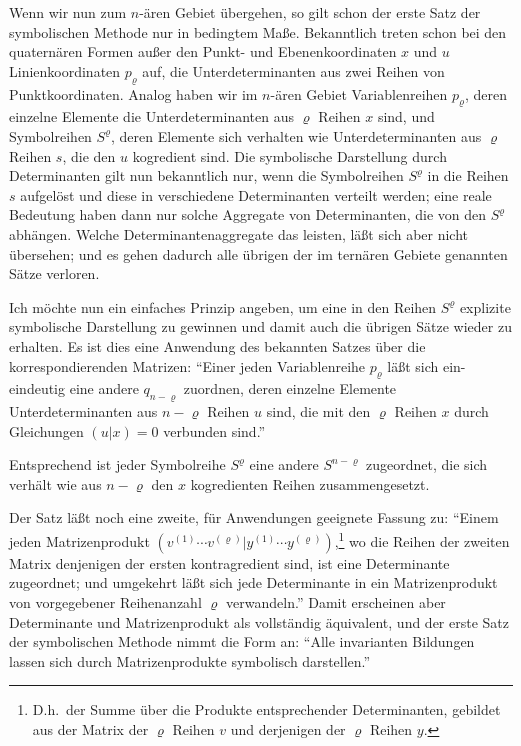 \documentclass[12pt,a4paper]{article}
\begin{document}
Wenn wir nun zum $n$-ären Gebiet übergehen, so gilt schon der erste Satz der symbolischen Methode nur in bedingtem Maße. Bekanntlich treten schon bei den quaternären Formen außer den Punkt- und Ebenenkoordinaten $x$ und $u$ Linienkoordinaten $p_{\varrho}$ auf, die Unterdeterminanten aus zwei Reihen von Punktkoordinaten. Analog haben wir im $n$-ären Gebiet Variablenreihen $p_{\varrho}$, deren einzelne Elemente die Unterdeterminanten aus $\varrho$ Reihen $x$ sind, und Symbolreihen $S^{\varrho}$, deren Elemente sich verhalten wie Unterdeterminanten aus $\varrho$ Reihen $s$, die den $u$ kogredient sind. Die symbolische Darstellung durch Determinanten gilt nun bekanntlich nur, wenn die Symbolreihen $S^{\varrho}$ in die Reihen $s$ aufgelöst und diese in verschiedene Determinanten verteilt werden; eine reale Bedeutung haben dann nur solche Aggregate von Determinanten, die von den $S^{\varrho}$ abhängen. Welche Determinantenaggregate das leisten, läßt sich aber nicht übersehen; und es gehen dadurch alle übrigen der im ternären Gebiete genannten Sätze verloren.

Ich möchte nun ein einfaches Prinzip angeben, um eine in den Reihen $S^{\varrho}$ explizite symbolische Darstellung zu gewinnen und damit auch die übrigen Sätze wieder zu erhalten. Es ist dies eine Anwendung des bekannten Satzes über die korrespondierenden Matrizen: ``Einer jeden Variablenreihe $p_{\varrho}$ läßt sich ein-eindeutig eine andere $q_{n-\varrho}$ zuordnen, deren einzelne Elemente Unterdeterminanten aus $n-\varrho$ Reihen $u$ sind, die mit den $\varrho$ Reihen $x$ durch Gleichungen $(u|x)=0$ verbunden sind.''

Entsprechend ist jeder Symbolreihe $S^{\varrho}$ eine andere $S^{n-\varrho}$ zugeordnet, die sich verhält wie aus $n-\varrho$ den $x$ kogredienten Reihen zusammengesetzt.

Der Satz läßt noch eine zweite, für Anwendungen geeignete Fassung zu: ``Einem jeden Matrizenprodukt $(v^{(1)} \cdots v^{(\varrho)} | y^{(1)} \cdots y^{(\varrho)})$,\footnote{D.h.\ der Summe über die Produkte entsprechender Determinanten, gebildet aus der Matrix der $\varrho$ Reihen $v$ und derjenigen der $\varrho$ Reihen $y$.} wo die Reihen der zweiten Matrix denjenigen der ersten kontragredient sind, ist eine Determinante zugeordnet; und umgekehrt läßt sich jede Determinante in ein Matrizenprodukt von vorgegebener Reihenanzahl $\varrho$ verwandeln.'' Damit erscheinen aber Determinante und Matrizenprodukt als vollständig äquivalent, und der erste Satz der symbolischen Methode nimmt die Form an: ``Alle invarianten Bildungen lassen sich durch Matrizenprodukte symbolisch darstellen.''
\end{document}
